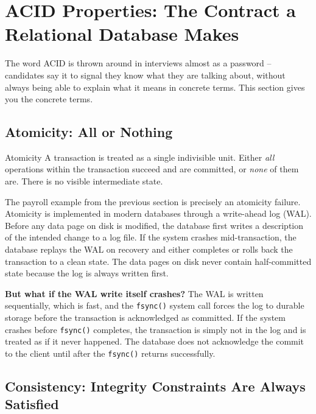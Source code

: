 \documentclass[11pt,a4paper]{article}
\begin{document}
\newpage

\section{ACID Properties: The Contract a Relational Database Makes}

The word ACID is thrown around in interviews almost as a password -- candidates say it to signal they know what they are talking about, without always being able to explain what it means in concrete terms. This section gives you the concrete terms.

\subsection{Atomicity: All or Nothing}

\begin{termbox}{Atomicity}
A transaction is treated as a single indivisible unit. Either \emph{all} operations within the transaction succeed and are committed, or \emph{none} of them are. There is no visible intermediate state.
\end{termbox}

The payroll example from the previous section is precisely an atomicity failure. Atomicity is implemented in modern databases through a write-ahead log (WAL). Before any data page on disk is modified, the database first writes a description of the intended change to a log file. If the system crashes mid-transaction, the database replays the WAL on recovery and either completes or rolls back the transaction to a clean state. The data pages on disk never contain half-committed state because the log is always written first.

\begin{thinkbox}
\textbf{But what if the WAL write itself crashes?} The WAL is written sequentially, which is fast, and the \texttt{fsync()} system call forces the log to durable storage before the transaction is acknowledged as committed. If the system crashes before \texttt{fsync()} completes, the transaction is simply not in the log and is treated as if it never happened. The database does not acknowledge the commit to the client until after the \texttt{fsync()} returns successfully.
\end{thinkbox}

\subsection{Consistency: Integrity Constraints Are Always Satisfied}
\end{document}
